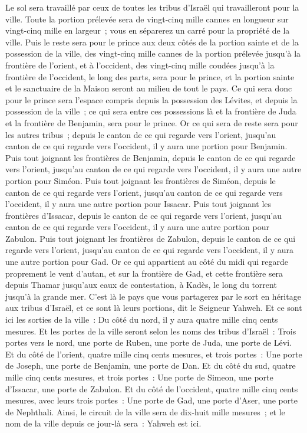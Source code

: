 \begin{multicols}{2}
Le sol sera travaillé par ceux de toutes les tribus d'Israël qui travailleront pour la ville.
Toute la portion prélevée sera de vingt-cinq mille cannes en longueur sur vingt-cinq mille en largeur~; vous en séparerez un carré pour la propriété de la ville.
Puis le reste sera pour le prince aux deux côtés de la portion sainte et de la possession de la ville, des vingt-cinq mille cannes de la portion prélevée jusqu'à la frontière de l'orient, et à l'occident, des vingt-cinq mille coudées jusqu'à la frontière de l'occident, le long des parts, sera pour le prince, et la portion sainte et le sanctuaire de la Maison seront au milieu de tout le pays.
Ce qui sera donc pour le prince sera l'espace compris depuis la possession des Lévites, et depuis la possession de la ville~; ce qui sera entre ces possessions là et la frontière de Juda et la frontière de Benjamin, sera pour le prince.
Or ce qui sera de reste sera pour les autres tribus~; depuis le canton de ce qui regarde vers l'orient, jusqu'au canton de ce qui regarde vers l'occident, il y aura une portion pour Benjamin.
Puis tout joignant les frontières de Benjamin, depuis le canton de ce qui regarde vers l'orient, jusqu'au canton de ce qui regarde vers l'occident, il y aura une autre portion pour Siméon.
Puis tout joignant les frontières de Siméon, depuis le canton de ce qui regarde vers l'orient, jusqu'au canton de ce qui regarde vers l'occident, il y aura une autre portion pour Issacar.
Puis tout joignant les frontières d'Issacar, depuis le canton de ce qui regarde vers l'orient, jusqu'au canton de ce qui regarde vers l'occident, il y aura une autre portion pour Zabulon.
Puis tout joignant les frontières de Zabulon, depuis le canton de ce qui regarde vers l'orient, jusqu'au canton de ce qui regarde vers l'occident, il y aura une autre portion pour Gad.
Or ce qui appartient au côté du midi qui regarde proprement le vent d'autan, et sur la frontière de Gad, et cette frontière sera depuis Thamar jusqu'aux eaux de contestation, à Kadès, le long du torrent jusqu'à la grande mer.
C'est là le pays que vous partagerez par le sort en héritage aux tribus d'Israël, et ce sont là leurs portions, dit le Seigneur Yahweh.
Et ce sont ici les sorties de la ville~: Du côté du nord, il y aura quatre mille cinq cents mesures.
Et les portes de la ville seront selon les noms des tribus d'Israël~: Trois portes vers le nord, une porte de Ruben, une porte de Juda, une porte de Lévi.
Et du côté de l'orient, quatre mille cinq cents mesures, et trois portes~: Une porte de Joseph, une porte de Benjamin, une porte de Dan.
Et du côté du sud, quatre mille cinq cents mesures, et trois portes~: Une porte de Simeon, une porte d'Issacar, une porte de Zabulon.
Et du côté de l'occident, quatre mille cinq cents mesures, avec leurs trois portes~: Une porte de Gad, une porte d'Aser, une porte de Nephthali.
Ainsi, le circuit de la ville sera de dix-huit mille mesures~; et le nom de la ville depuis ce jour-là sera~: Yahweh est ici.
\PPE{}
\end{multicols}
